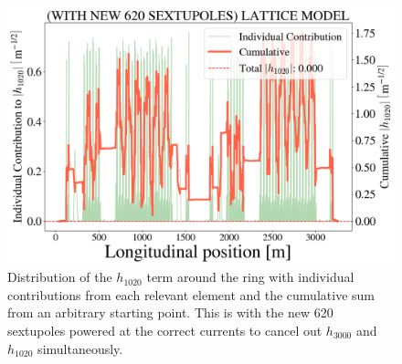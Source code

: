 \begin{figure}[H]
    \centering
    \includegraphics[width=\columnwidth]{chapter4/new_sexts_h1020.png}
    \caption{Distribution of the $h_{1020}$ term around the ring with individual contributions from each relevant element and the cumulative sum from an arbitrary starting point. This is with the new 620 sextupoles powered at the correct currents to cancel out $h_{3000}$ and $h_{1020}$ simultaneously.}
    \label{fig:h1020newsexts}
\end{figure}
